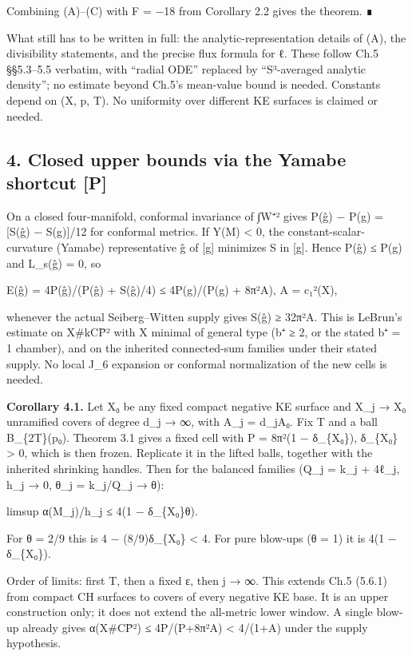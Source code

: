 \documentclass[
  10pt,
]{report}
\begin{document}
Combining (A)--(C) with F = −18 from Corollary 2.2 gives the theorem. ∎

What still has to be written in full: the analytic-representation
details of (A), the divisibility statements, and the precise flux
formula for ℓ. These follow Ch.5 §§5.3--5.5 verbatim, with ``radial
ODE'' replaced by ``S³-averaged analytic density''; no estimate beyond
Ch.5's mean-value bound is needed. Constants depend on (X, p, T). No
uniformity over different KE surfaces is claimed or needed.

\hypertarget{closed-upper-bounds-via-the-yamabe-shortcut-p}{%
\subsection{4. Closed upper bounds via the Yamabe shortcut
{[}P{]}}\label{closed-upper-bounds-via-the-yamabe-shortcut-p}}

On a closed four-manifold, conformal invariance of ∫\textbar W⁺\textbar²
gives P(ĝ) − P(g) = {[}S(ĝ) − S(g){]}/12 for conformal metrics. If Y(M)
\textless{} 0, the constant-scalar-curvature (Yamabe) representative ĝ
of {[}g{]} minimizes S in {[}g{]}. Hence P(ĝ) ≤ P(g) and L\_s(ĝ) = 0, so

E(ĝ) = 4P(ĝ)/(P(ĝ) + S(ĝ)/4) ≤ 4P(g)/(P(g) + 8π²A), A = c₁²(X),

whenever the actual Seiberg--Witten supply gives S(ĝ) ≥ 32π²A. This is
LeBrun's estimate on X\#kCP̄² with X minimal of general type (b⁺ ≥ 2, or
the stated b⁺ = 1 chamber), and on the inherited connected-sum families
under their stated supply. No local J\_6 expansion or conformal
normalization of the new cells is needed.

\textbf{Corollary 4.1.} Let X₀ be any fixed compact negative KE surface
and X\_j → X₀ unramified covers of degree d\_j → ∞, with A\_j = d\_jA₀.
Fix T and a ball B\_\{2T\}(p₀). Theorem 3.1 gives a fixed cell with P =
8π²(1 − δ\_\{X₀\}), δ\_\{X₀\} \textgreater{} 0, which is then frozen.
Replicate it in the lifted balls, together with the inherited shrinking
handles. Then for the balanced families (Q\_j = k\_j + 4ℓ\_j, h\_j → 0,
θ\_j = k\_j/Q\_j → θ):

limsup α(M\_j)/h\_j ≤ 4(1 − δ\_\{X₀\}θ).

For θ = 2/9 this is 4 − (8/9)δ\_\{X₀\} \textless{} 4. For pure blow-ups
(θ = 1) it is 4(1 − δ\_\{X₀\}).

Order of limits: first T, then a fixed ε, then j → ∞. This extends Ch.5
(5.6.1) from compact CH surfaces to covers of every negative KE base. It
is an upper construction only; it does not extend the all-metric lower
window. A single blow-up already gives α(X\#CP̄²) ≤ 4P/(P+8π²A)
\textless{} 4/(1+A) under the supply hypothesis.
\end{document}
